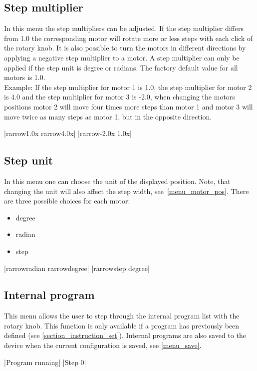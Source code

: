 \subsection{Step multiplier}
In this menu the step multipliers can be adjusted. If the step multiplier differs from 1.0 the corresponding motor will rotate more or less steps with each click of the rotary knob. It is also possible to turn the motors in different directions by applying a negative step multiplier to a motor. A step multiplier can only be applied if the step unit is degree or radians. The factory default value for all motors is 1.0.\\
Example: If the step multiplier for motor 1 is 1.0, the step multiplier for motor 2 is 4.0 and the step multiplier for motor 3 is -2.0, when changing the motors positions motor 2 will move four times more steps than motor 1 and motor 3 will move twice as many steps as motor 1, but in the opposite direction. 
\begin{center}
  |{rarrow}1.0x   {rarrow}4.0x|
             |{rarrow}-2.0x   1.0x|
\end{center}

\subsection{Step unit}
\label{chp:change_step_unit}
In this menu one can choose the unit of the displayed position. Note, that changing the unit will also affect the step width, see~\ref{menu_motor_pos}. There are three possible choices for each motor:
\begin{itemize}
\item degree
\item radian
\item step
\end{itemize}
\begin{center}
  |{rarrow}radian {rarrow}degree|
             |{rarrow}step    degree|
\end{center}

\subsection{Internal program}
This menu allows the user to step through the internal program list with the rotary knob.
This function is only available if a program has previously been defined (see \ref{section_instruction_set}).
Internal programs are also saved to the device when the current configuration is saved, see \ref{menu_save}.
\begin{center}
  |Program running|
             |Step 0|
\end{center}

